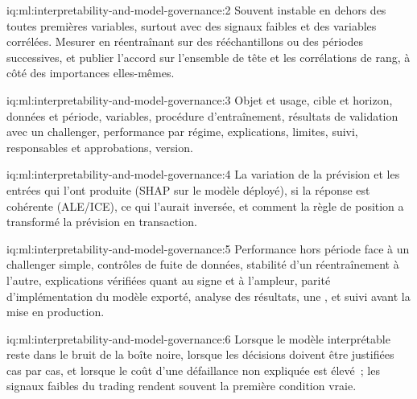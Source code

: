 \begin{solution}{iq:ml:interpretability-and-model-governance:2}
Souvent instable en dehors des toutes premières variables, surtout avec des signaux faibles et des variables corrélées. Mesurer en réentraînant sur
des rééchantillons ou des périodes successives, et publier l'accord sur l'ensemble de tête et les corrélations de rang, à côté des importances elles-mêmes.
\end{solution}

\begin{solution}{iq:ml:interpretability-and-model-governance:3}
Objet et usage, cible et horizon, données et période, variables, procédure d'entraînement, résultats de validation avec un challenger,
performance par régime, explications, limites, suivi, responsables et approbations, version.
\end{solution}

\begin{solution}{iq:ml:interpretability-and-model-governance:4}
La variation de la prévision et les entrées qui l'ont produite (SHAP sur le modèle déployé), si la réponse est cohérente (ALE/ICE),
ce qui l'aurait inversée, et comment la règle de position a transformé la prévision en transaction.
\end{solution}

\begin{solution}{iq:ml:interpretability-and-model-governance:5}
Performance hors période face à un challenger simple, contrôles de fuite de données, stabilité d'un réentraînement à l'autre, explications vérifiées quant au signe
et à l'ampleur, parité d'implémentation du modèle exporté, analyse des résultats, une , et suivi avant la mise en production.
\end{solution}

\begin{solution}{iq:ml:interpretability-and-model-governance:6}
Lorsque le modèle interprétable reste dans le bruit de la boîte noire, lorsque les décisions doivent être justifiées cas par cas, et lorsque le
coût d'une défaillance non expliquée est élevé~; les signaux faibles du trading rendent souvent la première condition vraie.
\end{solution}
